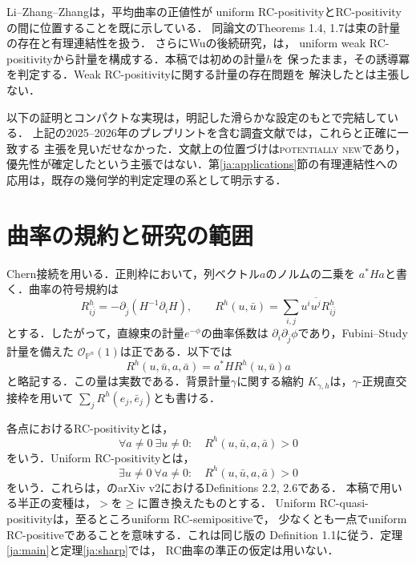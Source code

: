 \documentclass[12pt]{amsart}
\theoremstyle{definition}
\theoremstyle{remark}
\numberwithin{equation}{section}
\theoremstyle{definition}
\begin{document}
Li--Zhang--Zhang\cite[Proposition 3.6]{ja:LZZ}は，平均曲率の正値性が
uniform RC-positivityとRC-positivityの間に位置することを既に示している．
同論文のTheorems 1.4, 1.7は束の計量の存在と有理連結性を扱う．
さらにWuの後続研究\cite[Theorem 3]{ja:Wu25}，\cite[Theorem 7]{ja:Wu26}は，
uniform weak RC-positivityから計量を構成する．本稿では初めの計量$h$を
保ったまま，その誘導冪を判定する．Weak RC-positivityに関する計量の存在問題を
解決したとは主張しない．

以下の証明とコンパクトな実現は，明記した滑らかな設定のもとで完結している．
上記の2025--2026年のプレプリントを含む調査文献では，これらと正確に一致する
主張を見いだせなかった．文献上の位置づけは\textsc{potentially new}であり，
優先性が確定したという主張ではない．第\ref{ja:applications}節の有理連結性への
応用は，既存の幾何学的判定定理の系として明示する．

\section{曲率の規約と研究の範囲}
\label{ja:conventions}

Chern接続を用いる．正則枠において，列ベクトル$a$のノルムの二乗を
$a^*Ha$と書く．曲率の符号規約は
\begin{equation}\label{ja:chern}
 R^h_{i\bar j}=-\partial_{\bar j}(H^{-1}\partial_iH),\qquad
 R^h(u,\bar u)=\sum_{i,j}u^i\overline{u^j}R^h_{i\bar j}
\end{equation}
とする．したがって，直線束の計量$e^{-\phi}$の曲率係数は
$\partial_i\partial_{\bar j}\phi$であり，Fubini--Study計量を備えた
$\mathcal O_{\mathbb P^n}(1)$は正である．以下では
\[
 R^h(u,\bar u,a,\bar a)=a^*H R^h(u,\bar u)a
\]
と略記する．この量は実数である．背景計量$\gamma$に関する縮約
$K_{\gamma,h}$は，$\gamma$-正規直交接枠を用いて
$\sum_jR^h(e_j,\bar e_j)$とも書ける．

各点におけるRC-positivityとは，
\begin{equation}\label{ja:rc}
 \forall a\ne0\ \exists u\ne0:\quad
 R^h(u,\bar u,a,\bar a)>0
\end{equation}
をいう．Uniform RC-positivityとは，
\begin{equation}\label{ja:uniform}
 \exists u\ne0\ \forall a\ne0:\quad
 R^h(u,\bar u,a,\bar a)>0
\end{equation}
をいう．これらは，\cite{ja:Yan20}のarXiv v2におけるDefinitions 2.2, 2.6である．
本稿で用いる半正の変種は，$>$を$\geq$に置き換えたものとする．
Uniform RC-quasi-positivityは，至るところuniform RC-semipositiveで，
少なくとも一点でuniform RC-positiveであることを意味する．これは同じ版の
Definition 1.1に従う．定理\ref{ja:main}と定理\ref{ja:sharp}では，
RC曲率の準正の仮定は用いない．
\end{document}
